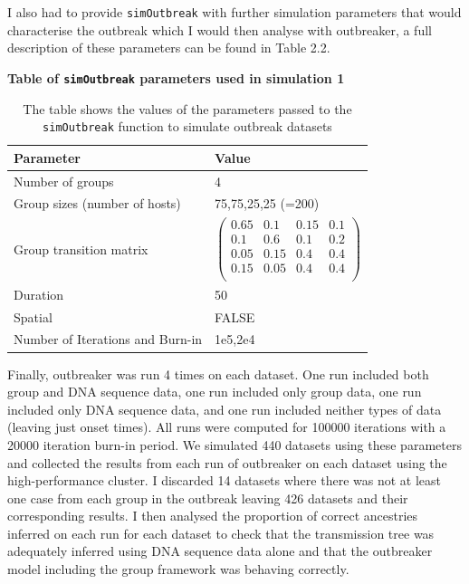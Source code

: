 \documentclass[11pt,a4paper]{report}
\begin{document}
I also had to provide {\tt simOutbreak} with further simulation parameters that would characterise the outbreak which I would then analyse with outbreaker, a full description of these parameters can be found in Table 2.2.
\begin{table}[h!]
\centering
{\bf Table of {\tt simOutbreak} parameters used in simulation 1}
\caption{The table shows the values of the parameters passed to the {\tt simOutbreak} function to simulate outbreak datasets}
\begin{tabular}{|l|l|}
\hline
Parameter & Value \\
\hline
Number of groups & 4 \\
\hline
Group sizes (number of hosts) & 75,75,25,25 (=200) \\
\hline
Group transition matrix &  $\begin{pmatrix}
	0.65 & 0.1 & 0.15 & 0.1 \\
	0.1 & 0.6 & 0.1 & 0.2 \\
	0.05 & 0.15 & 0.4 & 0.4 \\
	0.15 & 0.05 & 0.4 & 0.4 \\
\end{pmatrix}$ \\
\hline
Duration & 50 \\
\hline
Spatial & FALSE \\
\hline
Number of Iterations and Burn-in & 1e5,2e4 \\
\hline
\end{tabular}
\end{table}

Finally, outbreaker was run 4 times on each dataset. One run included both group and DNA sequence data, one run included only group data, one run included only DNA sequence data, and one run included neither types of data (leaving just onset times). All runs were computed for 100000 iterations with a 20000 iteration burn-in period. We simulated 440 datasets using these parameters  and collected the results from each run of outbreaker on each dataset using the high-performance cluster. I discarded 14 datasets where there was not at least one case from each group in the outbreak leaving 426 datasets and their corresponding results. I then analysed the proportion of correct ancestries inferred on each run for each dataset to check that the transmission tree was adequately inferred using DNA sequence data alone and that the outbreaker model including the group framework was behaving correctly.
\end{document}
